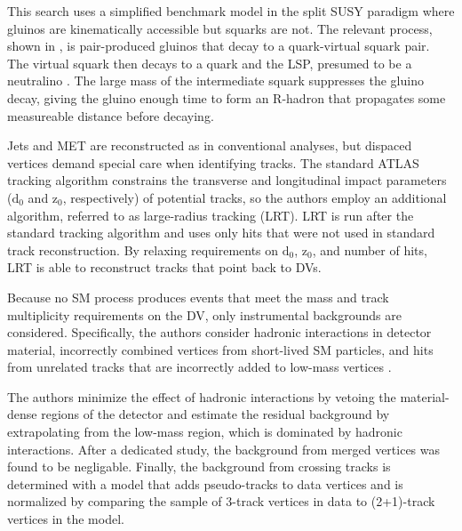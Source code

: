 \documentclass[12pt]{article}
\begin{document}
    This search uses a simplified benchmark model in the split SUSY paradigm where gluinos are kinematically accessible but squarks are not. The relevant process, shown in , is pair-produced gluinos that decay to a quark-virtual squark pair. The virtual squark then decays to a quark and the LSP, presumed to be a neutralino . The large mass of the intermediate squark suppresses the gluino decay, giving the gluino enough time to form an R-hadron that propagates some measureable distance before decaying. 

    Jets and MET are reconstructed as in conventional analyses, but dispaced vertices demand special care when identifying tracks. The standard ATLAS tracking algorithm constrains the transverse and longitudinal impact parameters ($\mathrm{d}_0$ and $\mathrm{z}_0$, respectively) of potential tracks, so the authors employ an additional algorithm, referred to as large-radius tracking (LRT). LRT is run after the standard tracking algorithm and uses only hits that were not used in standard track reconstruction. By relaxing requirements on $\mathrm{d}_0$, $\mathrm{z}_0$, and number of hits, LRT is able to reconstruct tracks that point back to DVs.
    
    Because no SM process produces events that meet the mass and track multiplicity requirements on the DV, only instrumental backgrounds are considered. Specifically, the authors consider hadronic interactions in detector material, incorrectly combined vertices from short-lived SM particles, and hits from unrelated tracks that are incorrectly added to low-mass vertices .

    The authors minimize the effect of hadronic interactions by vetoing the material-dense regions of the detector and estimate the residual background by extrapolating from the low-mass region, which is dominated by hadronic interactions. After a dedicated study, the background from merged vertices was found to be negligable. Finally, the background from crossing tracks is determined with a model that adds pseudo-tracks to data vertices and is normalized by comparing the sample of 3-track vertices in data to (2+1)-track vertices in the model.
\end{document}
